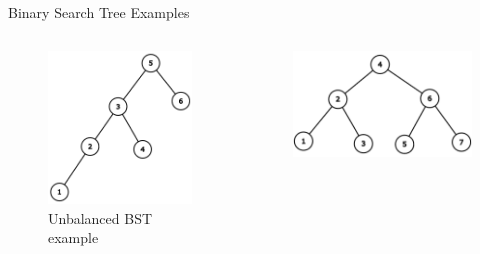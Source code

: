 \documentclass[aspectratio=169]{beamer}%
\begin{document}
\begin{frame}{Binary Search Tree Examples}
    \begin{columns}
        \begin{column}{0.32\textwidth}
            \begin{figure}
                \centering
                \includegraphics[width = 0.9\linewidth]{u_bst.png}
                \caption{Unbalanced BST example}
            \end{figure}
        \end{column}
        \hfill
        \begin{column}{0.32\textwidth}
            \begin{figure}
                \centering
                \includegraphics[width = 0.9\linewidth]{b_bst.png}

\end{figure}
\end{column}
\end{columns}
\end{frame}
\end{document}

